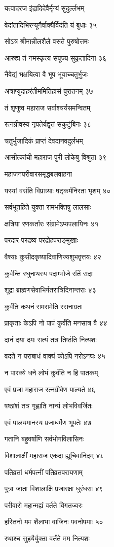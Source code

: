 यत्पादरज इंद्रादिदेवैर्मृग्यं सुदुर्ल्लभम्

वेदांतादिभिरन्यूनैर्वाक्यैर्विदंति यं बुधाः ३५

सोऽत्र श्रीमान्नीलशैले वसते पुरुषोत्तमः

आरुह्य तं नमस्कृत्य संपूज्य सुकृतादिना ३६

नैवेद्यं भक्षयित्वा वै भूप भूयाच्चतुर्भुजः

अत्राप्युदाहरंतीममितिहासं पुरातनम् ३७

तं शृणुष्व महाराज सर्वाश्चर्यसमन्वितम्

रत्नग्रीवस्य नृपतेर्यद्वृत्तं सकुटुंबिनः ३८

चतुर्भुजादिकं प्राप्तं देवदानवदुर्लभम्

आसीत्कांची महाराज पुरी लोकेषु विश्रुता ३९

महाजनपरीवारसमृद्धबलवाहना

यस्यां वसंति विप्राग्र्याः षट्कर्मनिरता भृशम् ४०

सर्वभूतहिते युक्ता रामभक्तिषु लालसाः

क्षत्रिया रणकर्तारः संग्रामेऽप्यपलायिनः ४१

परदार परद्रव्य परद्रोहपराङ्मुखाः

वैश्याः कुसीदकृष्यादिवाणिज्यशुभवृत्तयः ४२

कुर्वन्ति रघुनाथस्य पदाम्भोजे रतिं सदा

शूद्रा ब्राह्मणसेवाभिर्गतरात्रिदिनान्तराः ४३

कुर्वंति कथनं रामरामेति रसनाग्रतः

प्राकृताः केऽपि नो पापं कुर्वंति मनसात्र वै ४४

दानं दया दमः सत्यं तत्र तिष्ठंति नित्यशः

वदते न पराबाधं वाक्यं कोऽपि नरोऽनघः ४५

न पारक्ये धने लोभं कुर्वंति न हि पातकम्

एवं प्रजा महाराज रत्नग्रीवेण पाल्यते ४६

षष्ठांशं तत्र गृह्णाति नान्यं लोभविवर्जितः

एवं पालयमानस्य प्रजाधर्मेण भूपतेः ४७

गतानि बहुवर्षाणि सर्वभोगविलासिनः

विशालाक्षीं महाराज एकदा ह्यूचिवानिदम् ४८

पतिव्रतां धर्मपत्नीं पतिव्रतपरायणाम्

पुत्रा जाता विशालाक्षि प्रजारक्षा धुरंधराः ४९

परीवारो महान्मह्यं वर्तते विगतज्वरः

हस्तिनो मम शैलाभा वाजिनः पवनोपमाः ५०

रथाश्च सुहयैर्युक्ता वर्तंते मम नित्यशः

